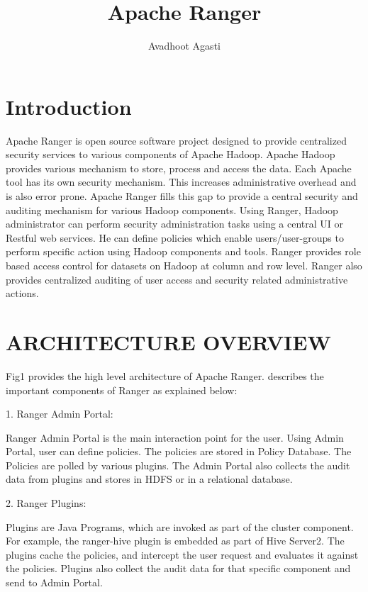 \documentclass[9pt,twocolumn,twoside]{styles/osajnl}
\title{Apache Ranger}
\author[1,*, +]{Avadhoot Agasti}
\affil[1]{School of Informatics and Computing, Bloomington, IN 47408, U.S.A.}
\affil[*]{Corresponding authors: aagasti@indiana.edu}
\affil[+]{HID - SL-IO-3000}
\begin{document}
\maketitle

\section{Introduction}

Apache Ranger is open source software project designed to provide centralized
 security services to various components of Apache Hadoop. Apache Hadoop
 provides various mechanism to store, process and access the data. Each
 Apache tool has its own security mechanism. This increases administrative
 overhead and is also error prone. Apache Ranger fills this gap to provide
 a central security and auditing mechanism for various Hadoop components. Using
  Ranger, Hadoop administrator can perform security administration tasks
  using a central UI or Restful web services. He can define policies which
  enable users/user-groups to perform specific action using Hadoop components
   and tools. Ranger provides role based access control for datasets on
   Hadoop at column and row level. Ranger also provides centralized auditing
   of user access and security related administrative actions.

\section{ARCHITECTURE OVERVIEW}

Fig1 provides the high level architecture of Apache Ranger.
\cite{www-ranger-architecture} describes the important components of Ranger as
 explained below:

1. Ranger Admin Portal:

Ranger Admin Portal is the main interaction point for the user. Using Admin
Portal, user can define policies. The policies are stored in Policy Database.
 The Policies are polled by various plugins. The Admin Portal also collects
 the audit data from plugins and stores in HDFS or in a relational database.

2. Ranger Plugins:

Plugins are Java Programs, which are invoked as part of the cluster component.
 For example, the ranger-hive plugin is embedded as part of Hive Server2. The
  plugins cache the policies, and intercept the user request and evaluates it
   against the policies. Plugins also collect the audit data for that
   specific component and send to Admin Portal.
\end{document}
